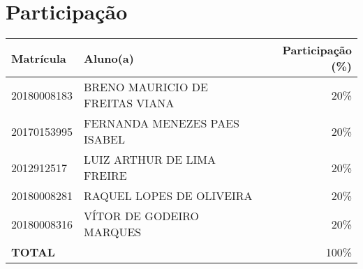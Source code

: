 \documentclass[12pt]{report}
\begin{document}
\chapter{Participação}
\begin{table}[h]
	\centering
	\label{my-label}
	\begin{tabular}{|l|l|r|}
		\hline
		\textbf{Matrícula} & \textbf{Aluno(a)} & \textbf{Participação (\%)} \\ \hline
		20180008183        & BRENO MAURICIO DE FREITAS VIANA & 20\%                       \\ \hline
		20170153995        & FERNANDA MENEZES PAES ISABEL    & 20\%                       \\ \hline
		2012912517         & LUIZ ARTHUR DE LIMA FREIRE      & 20\%                       \\ \hline
		20180008281        & RAQUEL LOPES DE OLIVEIRA        & 20\%                       \\ \hline
		20180008316        & VÍTOR DE GODEIRO MARQUES        & 20\%                       \\ \hline
		\multicolumn{2}{|l|}{\textbf{TOTAL}}            & 100\%                      \\ \hline
	\end{tabular}
\end{table}

\nocite{*}


\end{document}
